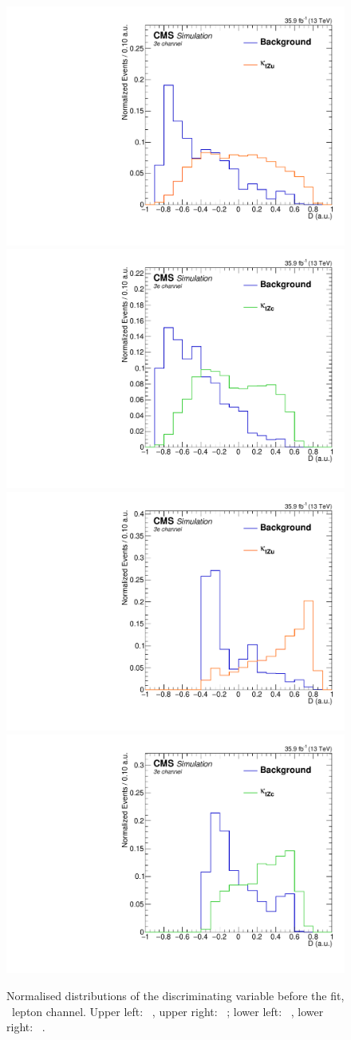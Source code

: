 \begin{figure}[htbp]
	\centering
	\includegraphics[width=0.49\linewidth]{6_Search/Figures/BDTdistributionsNorm/toppair_Zut_BDT_eee_Normalized}
	\includegraphics[width=0.49\linewidth]{6_Search/Figures/BDTdistributionsNorm/toppair_Zct_BDT_eee_Normalized}
	\includegraphics[width=0.49\linewidth]{6_Search/Figures/BDTdistributionsNorm/singletop_Zut_BDT_eee_Normalized}
	\includegraphics[width=0.49\linewidth]{6_Search/Figures/BDTdistributionsNorm/singletop_Zct_BDT_eee_Normalized}
	\caption{Normalised distributions of the discriminating variable before the fit, \eee\ lepton channel. Upper left: \TTSR\ \Zut , upper right: \TTSR\ \Zct ; lower left: \STSR\  \Zut , lower right: \STSR\  \Zct .}
	\label{fig:bdteeenorm}
\end{figure}	


